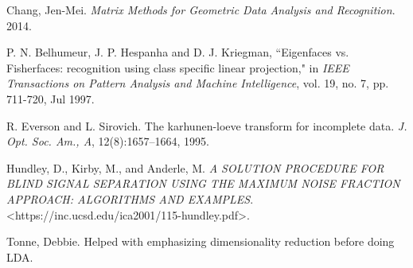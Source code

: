 \begin{thebibliography}{10}
    Chang, Jen-Mei. \textit{Matrix Methods for Geometric Data Analysis and Recognition}. 2014.

    P. N. Belhumeur, J. P. Hespanha and D. J. Kriegman, ``Eigenfaces vs. Fisherfaces: recognition using class specific linear projection," in \textit{IEEE Transactions on Pattern Analysis and Machine Intelligence}, vol. 19, no. 7, pp. 711-720, Jul 1997.

    R. Everson and L. Sirovich. The karhunen-loeve transform for incomplete data. \textit{J. Opt. Soc. Am., A}, 12(8):1657–1664, 1995.

    Hundley, D., Kirby, M., and Anderle, M. \textit{A SOLUTION PROCEDURE FOR BLIND SIGNAL SEPARATION USING THE MAXIMUM NOISE FRACTION APPROACH: ALGORITHMS AND EXAMPLES}.
    <https://inc.ucsd.edu/ica2001/115-hundley.pdf>.

    Tonne, Debbie. Helped with emphasizing dimensionality reduction before doing LDA.
\end{thebibliography}


